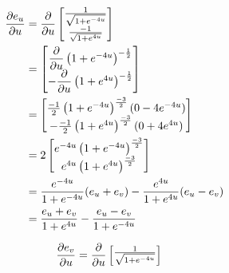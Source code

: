 \documentclass[a4paper, 11pt]{article}
\begin{document}
\begin{enumerate}[label=(\alph*)]
\begin{mdframed}
          \begin{minipage}[t]{0.5\textwidth}
            \begin{align*}
              \dfrac{\partial e_u}{\partial u} & = \dfrac{\partial}{\partial u}\begin{bmatrix}
                                    \frac{1}{\sqrt{1 + e^{-4u}}} \\
                                    \frac{-1}{\sqrt{1 + e^{4u}}}
                                  \end{bmatrix}                       \\
                        & = \begin{bmatrix}
                              \dfrac{\partial}{\partial u}\left( 1 + e^{-4u} \right)^{-\frac 12} \\
                              -\dfrac{\partial}{\partial u}\left(1 + e^{4u} \right)^{-\frac 12}
                            \end{bmatrix}                 \\
                        & =  \begin{bmatrix}
                               \frac{-1}2\left( 1+e^{-4u} \right)^{\frac{-3}2}(0-4e^{-4u}) \\
                               -\frac{-1}2\left( 1+e^{4u} \right)^{\frac{-3}2}(0+4e^{4u})
                             \end{bmatrix} \\
                        & =  2\begin{bmatrix}
                                e^{-4u}\left( 1+e^{-4u} \right)^{\frac{-3}2} \\
                                e^{4u}\left( 1+e^{4u} \right)^{\frac{-3}2}
                              \end{bmatrix}               \\
                        & =
              \frac{e^{-4u}}{
              1+e^{-4u}
              }(e_u+e_v)
              -\frac{e^{4u}}{1+e^{4u}}(e_u-e_v)                                          \\
                        & = \frac{e_u+e_v}{1+e^{4u}}-\frac{e_u-e_v}{1+e^{-4u}}
            \end{align*}
          \end{minipage}\begin{minipage}[t]{0.5\textwidth}
            \begin{align*}
              \dfrac{\partial e_v}{\partial u} & = \dfrac{\partial}{\partial u}\begin{bmatrix}
                                    \frac{1}{\sqrt{1 + e^{-4u}}} \\

\end{bmatrix}
\end{align*}
\end{minipage}
\end{mdframed}
\end{enumerate}
\end{document}
